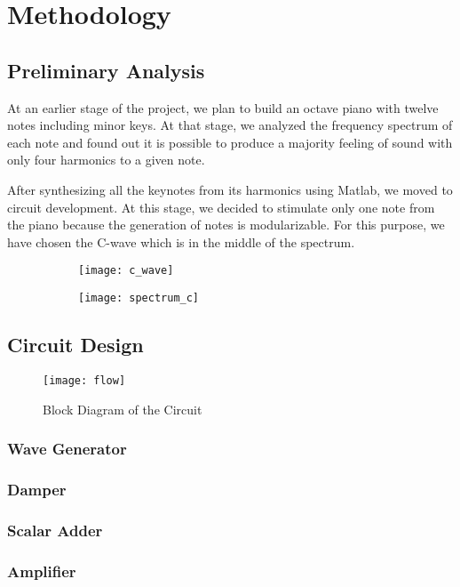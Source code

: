 \documentclass[class=article,crop=false]{standalone}
\begin{document}
\twocolumn

\section{Methodology}
\subsection{Preliminary Analysis}
At an earlier stage of the project, we plan to build an octave piano with twelve notes including minor keys. At that stage, we analyzed the frequency spectrum of each note and found out it is possible to produce a majority feeling of sound with only four harmonics to a given note. 
\par 
After synthesizing all the keynotes from its harmonics using Matlab, we moved to circuit development. At this stage, we decided to stimulate only one note from the piano because the generation of notes is modularizable. For this purpose, we have chosen the C-wave which is in the middle of the spectrum.
\begin{figure}
    \begin{subfigure}{.45\columnwidth}
        \centering
            \texttt{[image: c\_wave]}
    \end{subfigure}
    \begin{subfigure}{.45\columnwidth}
        \centering
            \texttt{[image: spectrum\_c]}
    \end{subfigure}

\end{figure}
\subsection{Circuit Design}

\begin{figure}
    \begin{center}
        \texttt{[image: flow]}
        \caption*{Block Diagram of the Circuit}
    \end{center}
\end{figure}
\subsubsection{Wave Generator}
\subsubsection{Damper}
\subsubsection{Scalar Adder}
\subsubsection{Amplifier}
\end{document}
